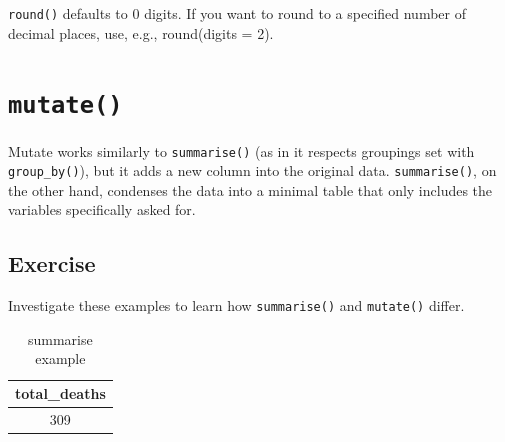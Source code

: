 \documentclass[12pt,]{krantz}
\makeatletter
\newenvironment{Shaded}{\begin{snugshade}}{\end{snugshade}}
\newcommand{\CharTok}[1]{\textcolor[rgb]{0.31,0.60,0.02}{#1}}
\newcommand{\DataTypeTok}[1]{\textcolor[rgb]{0.13,0.29,0.53}{#1}}
\newcommand{\DecValTok}[1]{\textcolor[rgb]{0.00,0.00,0.81}{#1}}
\newcommand{\KeywordTok}[1]{\textcolor[rgb]{0.13,0.29,0.53}{\textbf{#1}}}
\newcommand{\NormalTok}[1]{#1}
\newcommand{\OperatorTok}[1]{\textcolor[rgb]{0.81,0.36,0.00}{\textbf{#1}}}
\newcommand{\OtherTok}[1]{\textcolor[rgb]{0.56,0.35,0.01}{#1}}
\newcommand{\StringTok}[1]{\textcolor[rgb]{0.31,0.60,0.02}{#1}}
\newenvironment{kframe}{%
\medskip{}
\setlength{\fboxsep}{.8em}
 \def\at@end@of@kframe{}%
 \ifinner\ifhmode%
  \def\at@end@of@kframe{\end{minipage}}%
  \begin{minipage}{\columnwidth}%
 \fi\fi%
 \def\FrameCommand##1{\hskip\@totalleftmargin \hskip-\fboxsep
 \colorbox{shadecolor}{##1}\hskip-\fboxsep
     \hskip-\linewidth \hskip-\@totalleftmargin \hskip\columnwidth}%
 \MakeFramed {\advance\hsize-\width
   \@totalleftmargin\z@ \linewidth\hsize
   \@setminipage}}%
 {\par\unskip\endMakeFramed%
 \at@end@of@kframe}
\renewenvironment{Shaded}{\begin{kframe}}{\end{kframe}}
\theoremstyle{definition}
\theoremstyle{definition}
\theoremstyle{definition}
\theoremstyle{remark}
\makeatother
\begin{document}
\texttt{round()} defaults to 0 digits. If you want to round to a
specified number of decimal places, use, e.g., round(digits = 2).

\hypertarget{mutate}{%
\section{\texorpdfstring{\texttt{mutate()}}{mutate()}}\label{mutate}}

Mutate works similarly to \texttt{summarise()} (as in it respects
groupings set with \texttt{group\_by()}), but it adds a new column into
the original data. \texttt{summarise()}, on the other hand, condenses
the data into a minimal table that only includes the variables
specifically asked for.

\hypertarget{exercise-13}{%
\subsection{Exercise}\label{exercise-13}}

Investigate these examples to learn how \texttt{summarise()} and
\texttt{mutate()} differ.

\begin{Shaded}
\end{Shaded}

\begin{table}[t]

\caption{\label{tab:unnamed-chunk-12}summarise example}
\centering
\begin{tabular}{c}
\toprule
total\_deaths\\
\midrule
309\\
\bottomrule
\end{tabular}
\end{table}

\begin{Shaded}
\end{Shaded}
\end{document}
